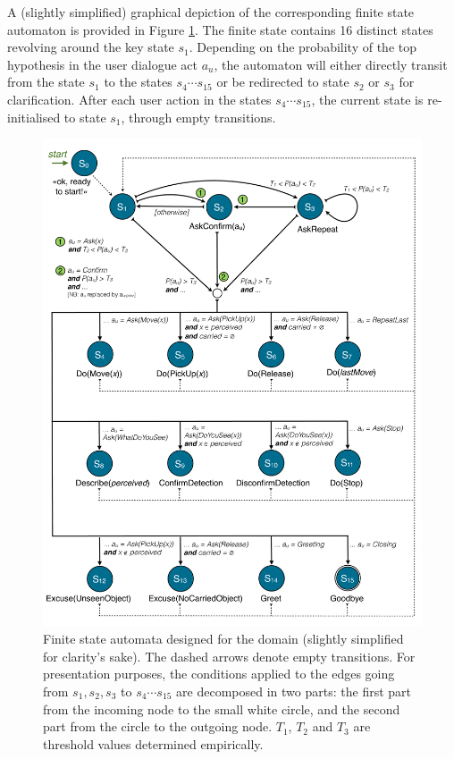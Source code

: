 A (slightly simplified) graphical depiction of the corresponding finite state automaton is provided in Figure \ref{fig:fsa-exp3}.  The finite state contains 16 distinct states revolving around the key state $s_1$.  Depending on the probability of the top hypothesis in the user dialogue act $a_u$, the automaton will either directly transit from the state $s_1$ to the states $s_4 \cdots s_{15}$ or be redirected to state $s_2$ or $s_3$ for clarification. After each user action in the states $s_4 \cdots s_{15}$, the current state is re-initialised to state $s_1$, through empty transitions. 


\begin{figure}[p]
\centering
\includegraphics[scale=0.4]{imgs/fsa-exp3.pdf} 
\caption{Finite state automata designed for the domain (slightly simplified for clarity's sake). The dashed arrows denote empty transitions. For presentation purposes, the conditions applied to the edges going from $s_1,s_2,s_3$ to $s_4 \cdots s_{15}$ are decomposed in two parts: the first part from the incoming node to the small white circle, and the second part from the circle to the outgoing node. $T_1$, $T_2$ and $T_3$ are threshold values determined empirically.}
\label{fig:fsa-exp3}
\end{figure}


